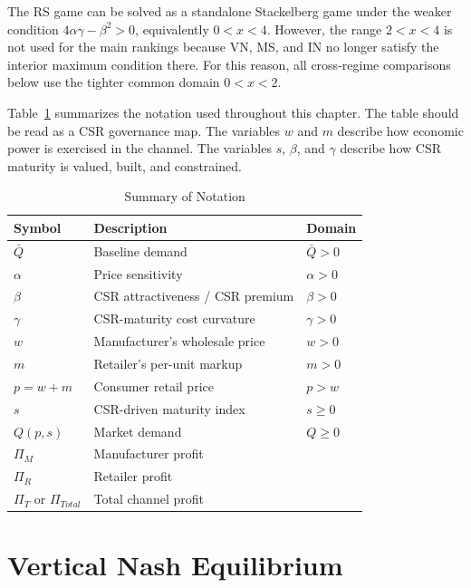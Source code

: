 The RS game can be solved as a standalone Stackelberg game under the weaker condition $4\alpha\gamma-\beta^2>0$, equivalently $0<x<4$. However, the range $2<x<4$ is not used for the main rankings because VN, MS, and IN no longer satisfy the interior maximum condition there. For this reason, all cross-regime comparisons below use the tighter common domain $0<x<2$.

Table~\ref{tab:ch3-notation} summarizes the notation used throughout this chapter. The table should be read as a CSR governance map. The variables $w$ and $m$ describe how economic power is exercised in the channel. The variables $s$, $\beta$, and $\gamma$ describe how CSR maturity is valued, built, and constrained.

\begin{table}[htbp]
\centering
\caption{Summary of Notation}
\label{tab:ch3-notation}
\begin{tabular}{lll}
\toprule
\textbf{Symbol} & \textbf{Description} & \textbf{Domain} \\
\midrule
$\bar{Q}$ & Baseline demand & $\bar{Q}>0$ \\
$\alpha$ & Price sensitivity & $\alpha>0$ \\
$\beta$ & CSR attractiveness / CSR premium & $\beta>0$ \\
$\gamma$ & CSR-maturity cost curvature & $\gamma>0$ \\
$w$ & Manufacturer's wholesale price & $w>0$ \\
$m$ & Retailer's per-unit markup & $m>0$ \\
$p=w+m$ & Consumer retail price & $p>w$ \\
$s$ & CSR-driven maturity index & $s\geq 0$ \\
$Q(p,s)$ & Market demand & $Q\geq 0$ \\
$\Pi_M$ & Manufacturer profit & \\
$\Pi_R$ & Retailer profit & \\
$\Pi_T$ or $\Pi_{Total}$ & Total channel profit & \\
\bottomrule
\end{tabular}
\end{table}

\section{Vertical Nash Equilibrium}
\label{sec:vn}

